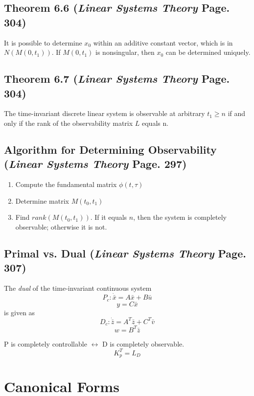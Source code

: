 \documentclass[12pt]{article}
\begin{document}
\subsection*{Theorem 6.6 ({\em Linear Systems Theory} Page. 304)}
It is possible to determine $x_0$ within an additive constant vector, which is in $N(M(0,t_1))$. If $M(0,t_1)$ is nonsingular, then $x_0$ can be determined uniquely. 

\subsection*{Theorem 6.7 ({\em Linear Systems Theory} Page. 304)}
The time-invariant discrete linear system is observable at arbitrary $t_1\geq n$ if and only if the rank of the observability matrix $L$ equals n.

\subsection*{Algorithm for Determining Observability ({\em Linear Systems Theory} Page. 297)}
\begin{enumerate}
	\item Compute the fundamental matrix $\phi(t,\tau)$
	\item Determine matrix $M(t_0,t_1)$
	\item Find $rank(M(t_0,t_1))$. If it equals $n$, then the system is completely observable; otherwise it is not. 
\end{enumerate}

\subsection*{Primal vs. Dual ({\em Linear Systems Theory} Page. 307)}
The {\em dual} of the time-invariant continuous system
$$P_c:\dot{\bar{x}}=A\bar{x}+B\bar{u}$$
$$y=C\bar{x}$$
is given as
$$D_c:\dot{\bar{z}}=A^T\bar{z}+C^T\bar{v}$$
$$w=B^T\bar{z}$$

\noindent
P is completely controllable $\leftrightarrow$ D is completely observable.
$$K_p^T=L_D$$

\section*{Canonical Forms}
\end{document}
